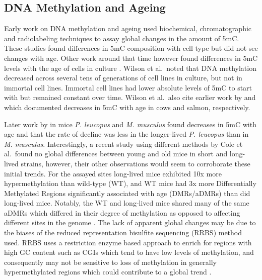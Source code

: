 \documentclass[]{book}
\begin{document}
\hypertarget{dna-methylation-and-ageing}{%
\subsection{DNA Methylation and Ageing}\label{dna-methylation-and-ageing}}

Early work on DNA methylation and ageing used biochemical, chromatographic and radiolabeling techniques to assay global changes in the amount of 5mC. These studies found differences in 5mC composition with cell type \citep{Ehrlich1982} but did not see changes with age. Other work around that time however found differences in 5mC levels with the age of cells in culture \citep{Wilson1983}. Wilson et al.~noted that DNA methylation decreased across several tens of generations of cell lines in culture, but not in immortal cell lines. Immortal cell lines had lower absolute levels of 5mC to start with but remained constant over time. Wilson et al.~also cite earlier work by \citet{Romanov1981} and \citet{Berdyshev1967} which documented decreases in 5mC with age in cows and salmon, respectively.

Later work by \citet{Wilson1987} in mice \emph{P. leucopus} and \emph{M. musculus} found decreases in 5mC with age and that the rate of decline was less in the longer-lived \emph{P. leucopus} than in \emph{M. musculus}. Interestingly, a recent study using different methods by Cole et al.~found no global differences between young and old mice in short and long-lived strains, however, their other observations would seem to corroborate these initial trends. For the assayed sites long-lived mice exhibited 10x more hypermethylation than wild-type (WT), and WT mice had 3x more Differentially Methylated Regions significantly associated with age (DMRs/aDMRs) than did long-lived mice. Notably, the WT and long-lived mice shared many of the same aDMRs which differed in their degree of methylation as opposed to affecting different sites in the genome \citep{Cole2017}. The lack of apparent global changes may be due to the biases of the reduced representation bisulfite sequencing (RRBS) method used. RRBS uses a restriction enzyme based approach to enrich for regions with high GC content such as CGIs which tend to have low levels of methylation, and consequently may not be sensitive to loss of methylation in generally hypermethylated regions which could contribute to a global trend \citep{Meissner2005}.
\end{document}
